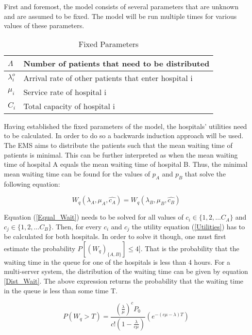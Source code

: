 First and foremost, the model consists of several parameters that are unknown and 
are assumed to be fixed. 
The model will be run multiple times for various values of these parameters.


\begin{table}[h]
    \centering
    \begin{tabular}{|l|l|}
        \hline
        \( \Lambda \) & Number of patients that need to be distributed \\ \hline
        \( \lambda_i^o \) & Arrival rate of other patients that enter hospital i \\ \hline
        \( \mu_i \) & Service rate of hospital i \\ \hline
        \( C_i \) & Total capacity of hospital i \\ \hline
    \end{tabular}
    \caption{Fixed Parameters}
\end{table}

Having established the fixed parameters of the model, the hospitals' utilities need 
to be calculated. 
In order to do so a backwards induction approach will be used. 
The EMS aims to distribute the patients such that the mean waiting time of patients 
is minimal. 
This can be further interpreted as when the mean waiting time of hospital A equals 
the mean waiting time of hospital B. 
Thus, the minimal mean waiting time can be found for the values of \( p_A \) and 
\( p_B \) that solve the following equation:

\begin{equation}\label{Equal_Wait}
    W_q(\lambda_A, \mu_A, \hat{c_A}) = W_q(\lambda_B, \mu_B, \hat{c_B})
\end{equation}

Equation (\ref{Equal_Wait}) needs to be solved for all values of \( c_i \in \{1,2, 
\dots C_A\} \) and \( c_j \in \{1,2, \dots C_B\} \). 
Then, for every \( c_i \) and \( c_j \) the utility equation (\ref{Utilities}) has 
to be calculated for both hospitals. 
In order to solve it though, one must first estimate the probability 
\( P[(W_q)_{\{A, B\}}] \leq 4] \). 
That is the probability that the waiting time in the queue for one of the hospitals 
is less than 4 hours. 
For a multi-server system, the distribution of the waiting time can be given by 
equation \ref{Dist_Wait}. 
The above expression returns the probability that the waiting time in the queue 
is less than some time T.

\begin{equation}\label{Dist_Wait}
    P(W_q > T) = \frac{(\frac{\lambda}{\mu})^c P_0}{c!(1-\frac{\lambda}{c \mu})} 
    (e^{-(c \mu - \lambda)T})
\end{equation}

